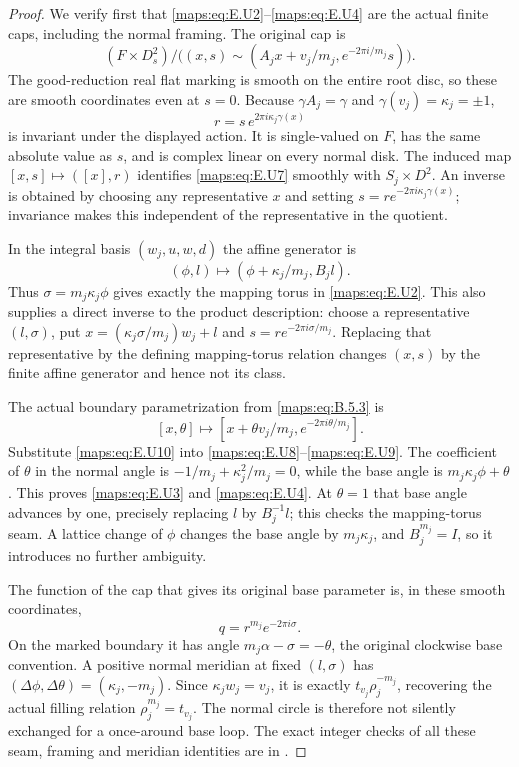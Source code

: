 \begin{proof}
We verify first that \eqref{maps:eq:E.U2}--\eqref{maps:eq:E.U4} are the actual finite caps,
including the normal framing.  The original cap is
\[
 (F\times D^2_s)/
 \bigl((x,s)\sim(A_jx+v_j/m_j,e^{-2\pi i/m_j}s)\bigr).
 \tag{E.U7}\label{maps:eq:E.U7}
\]
The good-reduction real flat marking is smooth on the entire
root disc, so these are smooth coordinates even at $s=0$.
Because $\gamma A_j=\gamma$ and $\gamma(v_j)=\kappa_j=\pm1$,
\[
                  r=s\,e^{2\pi i\kappa_j\gamma(x)}
 \tag{E.U8}\label{maps:eq:E.U8}
\]
is invariant under the displayed action.  It is single-valued
on $F$, has the same absolute value as $s$, and is complex
linear on every normal disk.  The induced map
$[x,s]\mapsto([x],r)$ identifies \eqref{maps:eq:E.U7} smoothly with
$S_j\times D^2$.  An inverse is obtained by choosing any
representative $x$ and setting
$s=r e^{-2\pi i\kappa_j\gamma(x)}$; invariance makes this
independent of the representative in the quotient.

In the integral basis $(w_j,u,w,d)$ the affine generator is
\[
                  (\phi,l)\longmapsto
                     (\phi+\kappa_j/m_j,B_jl).
 \tag{E.U9}\label{maps:eq:E.U9}
\]
Thus $\sigma=m_j\kappa_j\phi$ gives exactly the mapping torus
in \eqref{maps:eq:E.U2}.  This also supplies a direct inverse to the product
description: choose a representative $(l,\sigma)$, put
$x=(\kappa_j\sigma/m_j)w_j+l$ and
$s=r e^{-2\pi i\sigma/m_j}$.  Replacing that representative
by the defining mapping-torus relation changes $(x,s)$ by
the finite affine generator and hence not its class.

The actual boundary parametrization from \eqref{maps:eq:B.5.3} is
\[
 [x,\theta]\longmapsto
       [x+\theta v_j/m_j,e^{-2\pi i\theta/m_j}].
 \tag{E.U10}\label{maps:eq:E.U10}
\]
Substitute \eqref{maps:eq:E.U10} into \eqref{maps:eq:E.U8}--\eqref{maps:eq:E.U9}.  The coefficient of
$\theta$ in the normal angle is
$-1/m_j+\kappa_j^2/m_j=0$, while the base angle is
$m_j\kappa_j\phi+\theta$.  This proves \eqref{maps:eq:E.U3} and \eqref{maps:eq:E.U4}.
At $\theta=1$ that base angle advances by one, precisely
replacing $l$ by $B_j^{-1}l$; this checks the mapping-torus
seam.  A lattice change of $\phi$ changes the base angle by
$m_j\kappa_j$, and $B_j^{m_j}=I$, so it introduces no further
ambiguity.

The function of the cap that gives its original base parameter
is, in these smooth coordinates,
\[
                         q=r^{m_j}e^{-2\pi i\sigma}.
 \tag{E.U11}\label{maps:eq:E.U11}
\]
On the marked boundary it has angle
$m_j\alpha-\sigma=-\theta$, the original clockwise base
convention.  A positive normal meridian at fixed
$(l,\sigma)$ has $(\Delta\phi,\Delta\theta)=(\kappa_j,-m_j)$.
Since $\kappa_jw_j=v_j$, it is exactly $t_{v_j}\rho_j^{-m_j}$,
recovering the actual filling relation
$\rho_j^{m_j}=t_{v_j}$.  The normal circle is therefore not
silently exchanged for a once-around base loop.  The exact
integer checks of all these seam, framing and meridian
identities are in .


\end{proof}
